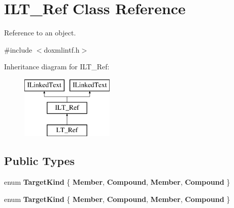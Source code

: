 \hypertarget{class_i_l_t___ref}{}\section{I\+L\+T\+\_\+\+Ref Class Reference}
\label{class_i_l_t___ref}


Reference to an object.  




{\ttfamily \#include $<$doxmlintf.\+h$>$}

Inheritance diagram for I\+L\+T\+\_\+\+Ref\+:\begin{figure}[H]
\begin{center}
\leavevmode
\includegraphics[height=3.000000cm]{class_i_l_t___ref}
\end{center}
\end{figure}
\subsection*{Public Types}
\begin{DoxyCompactItemize}
\item 
\mbox{\label{class_i_l_t___ref_a76e1fe83459ddebc82bea1930caf674d}} 
enum {\bfseries Target\+Kind} \{ {\bfseries Member}, 
{\bfseries Compound}, 
{\bfseries Member}, 
{\bfseries Compound}
 \}
\item 
\mbox{\label{class_i_l_t___ref_a76e1fe83459ddebc82bea1930caf674d}} 
enum {\bfseries Target\+Kind} \{ {\bfseries Member}, 
{\bfseries Compound}, 
{\bfseries Member}, 
{\bfseries Compound}
 \}
\end{DoxyCompactItemize}
